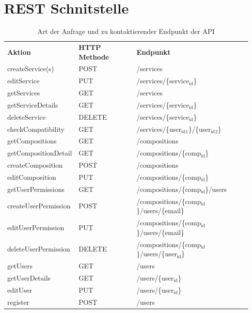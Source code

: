 \section{REST Schnitstelle}
\begin{table}[htbp]
\centering
\begin{tabularx}{\linewidth+20pt}{|X|l|X|}
\hline
\rowcolor[HTML]{C0C0C0}
\textbf{Aktion} & \textbf{HTTP Methode} & \textbf{Endpunkt}\\
\rowcolor[HTML]{E7E7E7}
createService(s) & POST & /services\\
editService & PUT & /services/\{service\(_{\text{id}}\)\}\\
\rowcolor[HTML]{E7E7E7}
getServices & GET & /services\\
getServiceDetails & GET & /services/\{service\(_{\text{id}}\)\}\\
\rowcolor[HTML]{E7E7E7}
deleteService & DELETE & /services/\{service\(_{\text{id}}\)\}\\
\hline
checkCompatibility & GET & /services/\{user\(_{\text{id}}\)\(_{\text{1}}\)\}/\{user\(_{\text{id}}\)\(_{\text{2}}\)\}\\
\hline
\rowcolor[HTML]{E7E7E7}
getCompositions & GET & /compositions\\
getCompositionDetail & GET & /compositions/\{comp\(_{\text{id}}\)\}\\
\rowcolor[HTML]{E7E7E7}
createComposition & POST & /compositions\\
editComposition & PUT & /compositions/\{comp\(_{\text{id}}\)\}\\
\rowcolor[HTML]{E7E7E7}
\hline
getUserPermissions & GET & /compositions/\{comp\(_{\text{id}}\)\}/users\\
createUserPermission & POST & /compositions/\{comp\(_{\text{id}}\)\}/users/\{email\}\\
\rowcolor[HTML]{E7E7E7}
editUserPermission & PUT & /compositions/\{comp\(_{\text{id}}\)\}/users/\{email\}\\
deleteUserPermission & DELETE & /compositions/\{comp\(_{\text{id}}\)\}/users/\{user\(_{\text{id}}\)\}\\
\rowcolor[HTML]{E7E7E7}
\hline
getUsers & GET & /users\\
getUserDetails & GET & /users/\{user\(_{\text{id}}\)\}\\
\rowcolor[HTML]{E7E7E7}
editUser & PUT & /users/\{user\(_{\text{id}}\)\}\\
register & POST & /users\\
\hline
\end{tabularx}
\caption{Art der Anfrage und zu kontaktierender Endpunkt der API}
\end{table}
